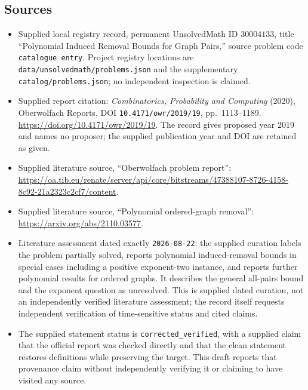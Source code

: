 \documentclass[11pt]{article}
\begin{document}
\subsection{Sources}
\begin{itemize}
\item Supplied local registry record, permanent UnsolvedMath ID \(30004133\), title ``Polynomial Induced Removal Bounds for Graph Pairs,'' source problem code \texttt{catalogue entry}. Project registry locations are \texttt{data/unsolvedmath/problems.json} and the supplementary \texttt{catalog/problems.json}; no independent inspection is claimed.
\item Supplied report citation: \emph{Combinatorics, Probability and Computing} (2020), Oberwolfach Reports, DOI \texttt{10.4171/owr/2019/19}, pp.\ 1113--1189. \url{https://doi.org/10.4171/owr/2019/19}. The record gives proposed year 2019 and names no proposer; the supplied publication year and DOI are retained as given.
\item Supplied literature source, ``Oberwolfach problem report'': \url{https://oa.tib.eu/renate/server/api/core/bitstreams/47388107-8726-4158-8c92-21a2323c2cf7/content}.
\item Supplied literature source, ``Polynomial ordered-graph removal'': \url{https://arxiv.org/abs/2110.03577}.
\item Literature assessment dated exactly \texttt{2026-08-22}: the supplied curation labels the problem partially solved, reports polynomial induced-removal bounds in special cases including a positive exponent-two instance, and reports further polynomial results for ordered graphs. It describes the general all-pairs bound and the exponent question as unresolved. This is supplied dated curation, not an independently verified literature assessment; the record itself requests independent verification of time-sensitive status and cited claims.
\item The supplied statement status is \texttt{corrected\_verified}, with a supplied claim that the official report was checked directly and that the clean statement restores definitions while preserving the target. This draft reports that provenance claim without independently verifying it or claiming to have visited any source.
\end{itemize}
\end{document}
